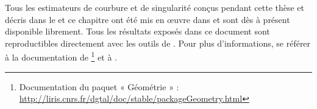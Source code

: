 Tous les estimateurs de courbure et de singularité conçus pendant cette thèse et
décris dans le  et ce chapitre ont été mis en œuvre
dans \DGtal et sont dès à présent disponible librement. Tous les résultats
exposés dans ce document sont reproductibles directement avec les outils de
\DGtal. Pour plus d'informations, se référer à la documentation de
\DGtal\footnote{Documentation du paquet « Géométrie » :
\url{http://liris.cnrs.fr/dgtal/doc/stable/packageGeometry.html}} et à
\cite{Coeurjolly2013Implementation}.
